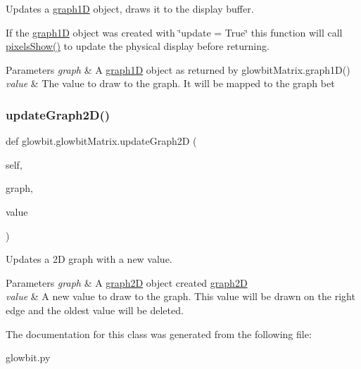 Updates a \hyperlink{classglowbit_1_1glowbitMatrix_1_1graph1D}{graph1D} object, draws it to the display buffer. 

If the \hyperlink{classglowbit_1_1glowbitMatrix_1_1graph1D}{graph1D} object was created with \char`\"{}update = True\char`\"{} this function will call \hyperlink{classglowbit_1_1glowbit_a051aed2a4969fdcb0466e4e840209279}{pixels\+Show()} to update the physical display before returning.


\begin{DoxyParams}{Parameters}
{\em graph} & A \hyperlink{classglowbit_1_1glowbitMatrix_1_1graph1D}{graph1D} object as returned by glowbit\+Matrix.\+graph1\+D() \\
\hline
{\em value} & The value to draw to the graph. It will be mapped to the graph bet \\
\hline
\end{DoxyParams}
\mbox{\label{classglowbit_1_1glowbitMatrix_ae9083babec0d5004363782540b60baed}} 
\subsubsection{\texorpdfstring{update\+Graph2\+D()}{updateGraph2D()}}
{\footnotesize\ttfamily def glowbit.\+glowbit\+Matrix.\+update\+Graph2D (\begin{DoxyParamCaption}\item[{}]{self,  }\item[{}]{graph,  }\item[{}]{value }\end{DoxyParamCaption})}



Updates a 2D graph with a new value. 


\begin{DoxyParams}{Parameters}
{\em graph} & A \hyperlink{classglowbit_1_1glowbitMatrix_1_1graph2D}{graph2D} object created \hyperlink{classglowbit_1_1glowbitMatrix_1_1graph2D}{graph2D} \\
\hline
{\em value} & A new value to draw to the graph. This value will be drawn on the right edge and the oldest value will be deleted. \\
\hline
\end{DoxyParams}


The documentation for this class was generated from the following file\+:\begin{DoxyCompactItemize}
\item 
glowbit.\+py\end{DoxyCompactItemize}
